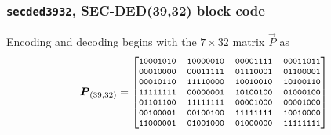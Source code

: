 \subsubsection{{\tt secded3932}, SEC-DED(39,32) block code}
\label{module:fec:secded:3932}
%
Encoding and decoding begins with the $7 \times 32$ matrix $\vec{P}$ as
%
\begin{equation*}
    \vec{P}_{(39,32)} = 
    \footnotesize{
    \begin{bmatrix}
        {\tt 10001010} & {\tt 10000010} & {\tt 00001111} & {\tt 00011011} \\
        {\tt 00010000} & {\tt 00011111} & {\tt 01110001} & {\tt 01100001} \\
        {\tt 00010110} & {\tt 11110000} & {\tt 10010010} & {\tt 10100110} \\
        {\tt 11111111} & {\tt 00000001} & {\tt 10100100} & {\tt 01000100} \\
        {\tt 01101100} & {\tt 11111111} & {\tt 00001000} & {\tt 00001000} \\
        {\tt 00100001} & {\tt 00100100} & {\tt 11111111} & {\tt 10010000} \\
        {\tt 11000001} & {\tt 01001000} & {\tt 01000000} & {\tt 11111111} \\
    \end{bmatrix}
    }
\end{equation*}
%

